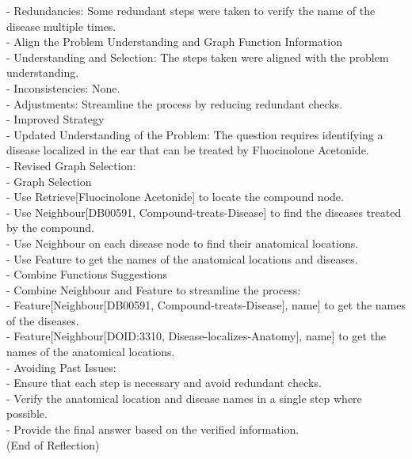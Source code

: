 \documentclass[11pt]{article}
\begin{document}
\begin{tcolorbox}[colback=white!10!white, colframe=blue!30!black, title=Reflection (Biomedical), boxrule=1pt, fontupper={\fontsize{7pt}{9pt}\selectfont}]
    - Redundancies: Some redundant steps were taken to verify the name of the disease multiple times.\\
  - Align the Problem Understanding and Graph Function Information\\
    - Understanding and Selection: The steps taken were aligned with the problem understanding.\\
    - Inconsistencies: None.\\
    - Adjustments: Streamline the process by reducing redundant checks.\\
- Improved Strategy\\
  - Updated Understanding of the Problem:
    The question requires identifying a disease localized in the ear that can be treated by Fluocinolone Acetonide.\\
  - Revised Graph Selection:\\
    - Graph Selection\\
      - Use Retrieve[Fluocinolone Acetonide] to locate the compound node.\\
      - Use Neighbour[DB00591, Compound-treats-Disease] to find the diseases treated by the compound.\\
      - Use Neighbour on each disease node to find their anatomical locations.\\
      - Use Feature to get the names of the anatomical locations and diseases.\\
    - Combine Functions Suggestions\\
      - Combine Neighbour and Feature to streamline the process:\\
        - Feature[Neighbour[DB00591, Compound-treats-Disease], name] to get the names of the diseases.\\
        - Feature[Neighbour[DOID:3310, Disease-localizes-Anatomy], name] to get the names of the anatomical locations.\\
  - Avoiding Past Issues:\\
    - Ensure that each step is necessary and avoid redundant checks.\\
    - Verify the anatomical location and disease names in a single step where possible.\\
    - Provide the final answer based on the verified information.\\
(End of Reflection)
\end{tcolorbox}
\end{document}
